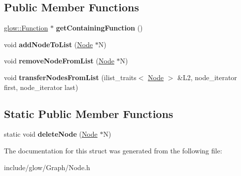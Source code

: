 \subsection*{Public Member Functions}
\begin{DoxyCompactItemize}
\item 
\mbox{\label{structllvm_1_1ilist__traits_3_01glow_1_1_node_01_4_aa7f4d503c687b58538d0d3816676622e}} 
\hyperlink{classglow_1_1_function}{glow\+::\+Function} $\ast$ {\bfseries get\+Containing\+Function} ()
\item 
\mbox{\label{structllvm_1_1ilist__traits_3_01glow_1_1_node_01_4_acc45723cefe0d700a2c5472773fdb3f8}} 
void {\bfseries add\+Node\+To\+List} (\hyperlink{classglow_1_1_node}{Node} $\ast$N)
\item 
\mbox{\label{structllvm_1_1ilist__traits_3_01glow_1_1_node_01_4_ac4a79ee54268a8552214131c1003fca1}} 
void {\bfseries remove\+Node\+From\+List} (\hyperlink{classglow_1_1_node}{Node} $\ast$N)
\item 
\mbox{\label{structllvm_1_1ilist__traits_3_01glow_1_1_node_01_4_a6bf1c4b282090f466c5a77839dc92f1e}} 
void {\bfseries transfer\+Nodes\+From\+List} (ilist\+\_\+traits$<$ \hyperlink{classglow_1_1_node}{Node} $>$ \&L2, node\+\_\+iterator first, node\+\_\+iterator last)
\end{DoxyCompactItemize}
\subsection*{Static Public Member Functions}
\begin{DoxyCompactItemize}
\item 
\mbox{\label{structllvm_1_1ilist__traits_3_01glow_1_1_node_01_4_a0d3558de747aa79997395b68f0a0db28}} 
static void {\bfseries delete\+Node} (\hyperlink{classglow_1_1_node}{Node} $\ast$N)
\end{DoxyCompactItemize}


The documentation for this struct was generated from the following file\+:\begin{DoxyCompactItemize}
\item 
include/glow/\+Graph/Node.\+h\end{DoxyCompactItemize}
